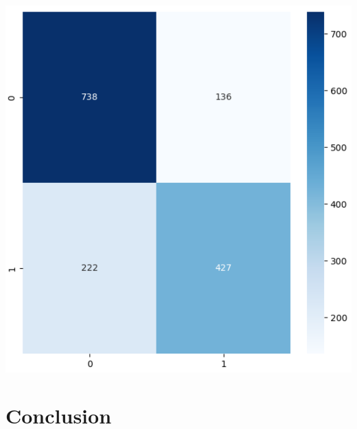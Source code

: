 \documentclass[11pt]{article}
\begin{document}
\begin{minipage}[b]{.45\linewidth}
\includegraphics[width=\linewidth]{images/mlp_heatmap.png}
\end{minipage}\hfill


\section{Conclusion}


\end{document}

